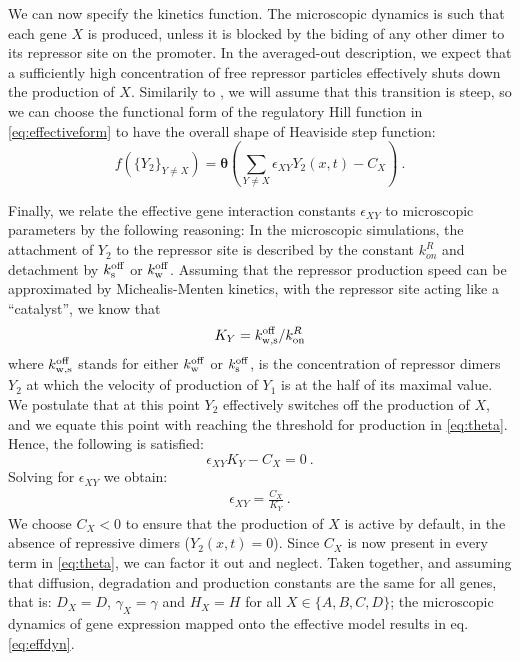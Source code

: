 \documentclass[a4paper,10pt]{article}
\begin{document}
We can now specify the kinetics function. The microscopic dynamics is such that each gene $X$ is produced, unless it is blocked by the biding of any other dimer to its repressor site on the promoter. In the averaged-out description, we expect that a sufficiently high concentration of free repressor particles effectively shuts down the production of $X$. Similarily to \cite{Majka2023}, we will assume that this transition is steep, so we can choose the functional form of the regulatory Hill function in \eqref{eq:effectiveform} to have the overall shape of Heaviside step function:
\begin{equation}
f(\{Y_2\}_{Y\neq X})=\boldsymbol\theta\left(\sum_{Y\neq X}\epsilon_{XY} Y_2(x,t)-C_X\right) ~. \label{eq:theta}
\end{equation}

Finally, we relate the effective gene interaction constants $\epsilon_{XY}$ to microscopic parameters by the following reasoning: In the microscopic simulations, the attachment of $Y_2$ to the repressor site is described by the constant $k_{on}^R$ and detachment by $k^{\rm off}_{\rm s}$ or $k^{\rm off}_{\rm w}$. Assuming that the repressor production speed can be approximated by Michealis-Menten kinetics, with the repressor site acting like a ``catalyst'', we know that
\begin{equation}
K_{Y}=k^{\rm off}_{\rm w,s}/k_{\rm on}^R
\end{equation}
where $k^{\rm off}_{\rm w,s}$ stands for either $k^{\rm off}_{\rm w}$ or $k^{\rm off}_{\rm s}$, is the concentration of repressor dimers $Y_2$ at which the velocity of production of $Y_1$ is at the half of its maximal value. We postulate that at this point $Y_2$ effectively switches off the production of $X$, and we equate this point with reaching the threshold for production in \eqref{eq:theta}. Hence, the following is satisfied:
\begin{equation}
\epsilon_{XY}K_{Y}-C_X=0 ~.
\end{equation}
Solving for $\epsilon_{XY}$ we obtain:
\begin{align}
\epsilon_{XY}=\frac{C_X}{K_{Y}} ~.
\end{align}
We choose $C_X<0$ to ensure that the production of $X$ is active by default, in the absence of repressive dimers ($Y_2(x,t)=0$). Since $C_X$ is now present in every term in \eqref{eq:theta}, we can factor it out and neglect. Taken together, and assuming that diffusion, degradation and production constants are the same for all genes, that is: $D_X=D$, $\gamma_X=\gamma$ and $H_X=H$ for all $X\in\{A,B,C,D\}$; the microscopic dynamics of gene expression mapped onto the effective model results in eq. \eqref{eq:effdyn}.
\end{document}
